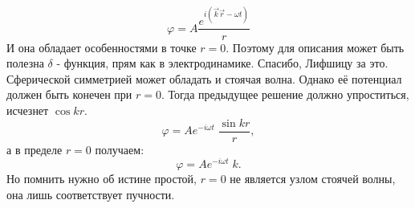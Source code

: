 \documentclass[14pt,a4paper,oneside]{extarticle}	%
\begin{document}
\begin{equation*}
\varphi  = A \frac{e^{i(\vec{k}\vec{r}-\omega t)}}{r}
\end{equation*}
И она обладает особенностями в точке $ r = 0 $. Поэтому для описания может быть полезна $ \delta $ - функция, прям как в электродинамике. Спасибо, Лифшицу за это.
Сферической симметрией может обладать и стоячая волна.
Однако её потенциал должен быть конечен при $ r = 0 $.
Тогда предыдущее решение должно упроститься, исчезнет $ \cos kr $.
\begin{equation*}
\varphi  = A e^{-i\omega t}\; \frac{\sin kr}{r},
\end{equation*}
а в пределе $ r = 0 $ получаем:
\begin{equation*}
\varphi  = A e^{-i\omega t}\;k.
\end{equation*}
Но помнить нужно об истине простой, $ r = 0 $ не является узлом стоячей волны, она лишь соответствует пучности.  
\end{document}
